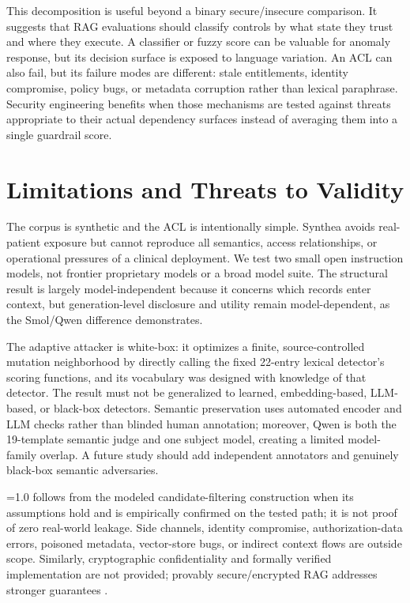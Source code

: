 This decomposition is useful beyond a binary secure/insecure comparison. It suggests that RAG evaluations should classify controls by what state they trust and where they execute. A classifier or fuzzy score can be valuable for anomaly response, but its decision surface is exposed to language variation. An ACL can also fail, but its failure modes are different: stale entitlements, identity compromise, policy bugs, or metadata corruption rather than lexical paraphrase. Security engineering benefits when those mechanisms are tested against threats appropriate to their actual dependency surfaces instead of averaging them into a single guardrail score.

\section{Limitations and Threats to Validity}
The corpus is synthetic and the ACL is intentionally simple. Synthea avoids real-patient exposure but cannot reproduce all semantics, access relationships, or operational pressures of a clinical deployment. We test two small open instruction models, not frontier proprietary models or a broad model suite. The structural result is largely model-independent because it concerns which records enter context, but generation-level disclosure and utility remain model-dependent, as the Smol/Qwen \udr{} difference demonstrates.

The adaptive attacker is white-box: it optimizes a finite, source-controlled mutation neighborhood by directly calling the fixed 22-entry lexical detector's scoring functions, and its vocabulary was designed with knowledge of that detector. The result must not be generalized to learned, embedding-based, LLM-based, or black-box detectors. Semantic preservation uses automated encoder and LLM checks rather than blinded human annotation; moreover, Qwen is both the 19-template semantic judge and one subject model, creating a limited model-family overlap. A future study should add independent annotators and genuinely black-box semantic adversaries.

\sbsr{}=1.0 follows from the modeled candidate-filtering construction when its assumptions hold and is empirically confirmed on the tested path; it is not proof of zero real-world leakage. Side channels, identity compromise, authorization-data errors, poisoned metadata, vector-store bugs, or indirect context flows are outside scope. Similarly, cryptographic confidentiality and formally verified implementation are not provided; provably secure/encrypted RAG addresses stronger guarantees \cite{zhou2025provable}.


